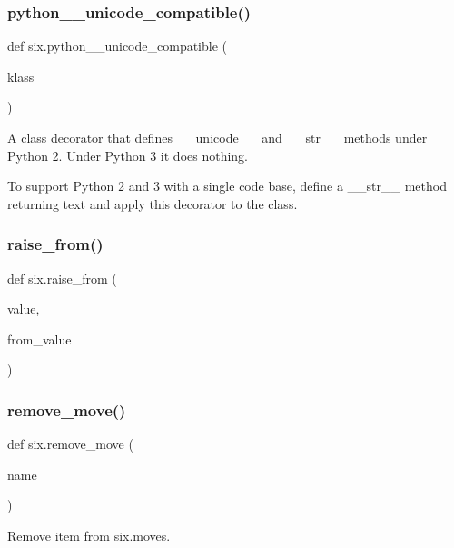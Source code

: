 \subsubsection{\texorpdfstring{python\+\_\+\_\+unicode\+\_\+compatible()}{python\_2\_unicode\_compatible()}}
{\footnotesize\ttfamily def six.\+python\+\_\+\_\+unicode\+\_\+compatible (\begin{DoxyParamCaption}\item[{}]{klass }\end{DoxyParamCaption})}

\begin{DoxyVerb}A class decorator that defines __unicode__ and __str__ methods under Python 2.
Under Python 3 it does nothing.

To support Python 2 and 3 with a single code base, define a __str__ method
returning text and apply this decorator to the class.
\end{DoxyVerb}
 \mbox{\label{namespacesix_a5321131a67ed38a6ffef95beebc1c334}} 
\subsubsection{\texorpdfstring{raise\+\_\+from()}{raise\_from()}}
{\footnotesize\ttfamily def six.\+raise\+\_\+from (\begin{DoxyParamCaption}\item[{}]{value,  }\item[{}]{from\+\_\+value }\end{DoxyParamCaption})}

\mbox{\label{namespacesix_a415a73f8f1dd244e895fb118878fb66d}} 
\subsubsection{\texorpdfstring{remove\+\_\+move()}{remove\_move()}}
{\footnotesize\ttfamily def six.\+remove\+\_\+move (\begin{DoxyParamCaption}\item[{}]{name }\end{DoxyParamCaption})}

\begin{DoxyVerb}Remove item from six.moves.\end{DoxyVerb}
 \mbox{\label{namespacesix_ae8a8e80e2dabc3c2bc2d8a582cfcc43d}} 
